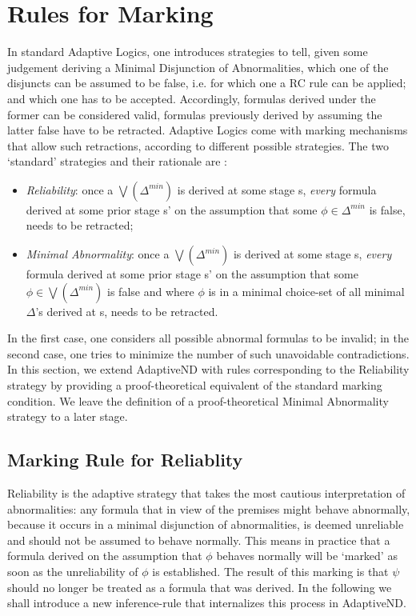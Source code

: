 \documentclass[]{article}
\begin{document}
 
\section{Rules for Marking}\label{sec:marking}

In standard Adaptive Logics, one introduces strategies to tell, given some judgement deriving a  Minimal Disjunction of Abnormalities, which one of the disjuncts can be assumed to be false, i.e. for which one a {\sf RC} rule can be applied; and which one has to be accepted. Accordingly, formulas derived under the former can be considered valid, formulas previously derived by assuming the latter false have to be retracted. Adaptive Logics come with marking mechanisms that allow such retractions, according to different possible strategies. The two `standard' strategies and their rationale are \cite{batens01}:

\begin{itemize}
\item \textit{Reliability}: once a $\bigvee(\Delta^{min})$ is derived at some stage {\sf s}, \textit{every} formula derived at some prior stage {\sf s'} on the assumption that some $\phi\in \Delta^{min}$ is false, needs to be retracted;

\item \textit{Minimal Abnormality}: once a $\bigvee(\Delta^{min})$ is derived at some stage {\sf s}, \textit{every} formula derived at some prior stage {\sf s'} on the assumption that some $\phi\in \bigvee(\Delta^{min})$ is false and where $\phi$ is in a minimal choice-set of all minimal $\Delta$'s derived at \textsf{s}, needs to be retracted.
\end{itemize}
%
In the first case, one considers all possible abnormal formulas to be invalid; in the second case, one tries to minimize the number of such unavoidable contradictions. In this section, we extend {\sf AdaptiveND} with rules corresponding to the Reliability strategy by providing a proof-theoretical equivalent of the standard marking condition. 
We leave the definition of a proof-theoretical Minimal Abnormality strategy to a later stage.


\subsection{Marking Rule for Reliablity}

Reliability is the adaptive strategy that takes the most cautious interpretation of abnormalities: any formula that in view of the premises might behave abnormally, because it occurs in a minimal disjunction of abnormalities, is deemed unreliable and should not be assumed to behave normally. This means in practice that a formula derived on the assumption that $\phi$ behaves normally will be `marked' as soon as the unreliability of $\phi$ is established. The result of this marking is that $\psi$ should no longer be treated as a formula that was derived. In the following we shall introduce a new inference-rule that internalizes this process in {\sf AdaptiveND}.
\end{document}
